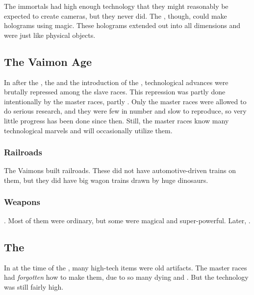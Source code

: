 The immortals had high enough technology that they might reasonably be expected to create cameras, but they never did. 
The \ophidians, though, could make holograms using magic. 
These holograms extended out into all dimensions and were just like physical objects. 











\subsection{The Vaimon Age}
In \Azmith after the , the  and the introduction of the \charade, technological advances were brutally repressed among the slave races. 
This repression was partly done intentionally by the master races, partly .
Only the master races were allowed to do serious research, and they were few in number and slow to reproduce, so very little progress has been done since then. 
Still, the master races know many technological marvels and will occasionally utilize them. 





\subsubsection{Railroads}
The Vaimons built railroads. 
These did not have automotive-driven trains on them, but they did have big wagon trains drawn by huge dinosaurs.





\subsubsection{Weapons}
. 
Most of them were ordinary, but some were magical and super-powerful. 
Later, . 









\subsection{The \Thirdbanewar}
In \Azmith at the time of the , many high-tech items were old artifacts. 
The master races had \emph{forgotten} how to make them, due to so many dying and . 
But the technology was still fairly high. 


